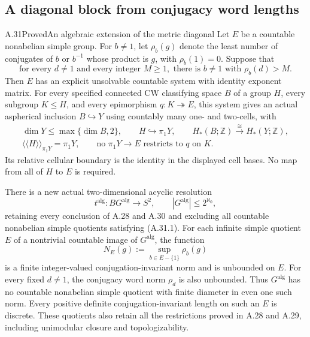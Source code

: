 \subsection{A diagonal block from conjugacy word lengths}

\begin{claim}{A.31}{Proved}{An algebraic extension of the metric diagonal}
Let $E$ be a countable nonabelian simple group. For $b\ne1$,
let $\rho_b(g)$ denote the least number of conjugates of
$b$ or $b^{-1}$ whose product is $g$, with $\rho_b(1)=0$.
Suppose that
\[
 \text{for every }d\ne1\text{ and every integer }M\geq1,
 \text{ there is }b\ne1\text{ with }\rho_b(d)>M.
 \tag{A.31.1}
\]
Then $E$ has an explicit unsolvable countable system with
identity exponent matrix. For every specified connected CW
classifying space $B$ of a group $H$, every subgroup
$K\leq H$, and every epimorphism $q:K\twoheadrightarrow E$,
this system gives an actual aspherical inclusion
$B\hookrightarrow Y$ using countably many one- and two-cells,
with
\[
 \begin{gathered}
 \dim Y\leq\max\{\dim B,2\},\qquad
 H\hookrightarrow\pi_1Y,\qquad
 H_*(B;\mathbb Z)\xrightarrow{\cong}H_*(Y;\mathbb Z),\\
 \langle\!\langle H\rangle\!\rangle_{\pi_1Y}=\pi_1Y,
 \qquad
 \text{no }\pi_1Y\longrightarrow E\text{ restricts to }q\text{ on }K.
 \end{gathered}
 \tag{A.31.2}
\]
Its relative cellular boundary is the identity in the
displayed cell bases. No map from all of $H$ to $E$ is
required.

There is a new actual two-dimensional acyclic resolution
\[
 t^{\mathrm{alg}}:BG^{\mathrm{alg}}\longrightarrow S^2,
 \qquad |G^{\mathrm{alg}}|\leq2^{\aleph_0},
 \tag{A.31.3}
\]
retaining every conclusion of A.28 and A.30 and excluding
all countable nonabelian simple quotients satisfying
(A.31.1). For each infinite simple quotient $E$ of a
nontrivial countable image of $G^{\mathrm{alg}}$, the function
\[
 N_E(g):=\sup_{b\in E-\{1\}}\rho_b(g)
 \tag{A.31.4}
\]
is a finite integer-valued conjugation-invariant norm and
is unbounded on $E$. For every fixed $d\ne1$, the
conjugacy word norm $\rho_d$ is also unbounded. Thus
$G^{\mathrm{alg}}$ has no countable nonabelian simple
quotient with finite diameter in even one such norm.
Every positive definite
conjugation-invariant length on such an $E$ is discrete.
These quotients also retain all the restrictions proved in
A.28 and A.29, including unimodular closure and
topologizability.
\end{claim}

